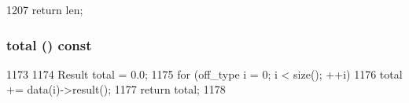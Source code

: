 \begin{DoxyCode}
1207 { return len; }
\end{DoxyCode}
\hypertarget{classStats_1_1VectorProxy_a35c6e2ed3fc81b40d69052a062113ead}{
\subsubsection[{total}]{ total () const}}
\label{classStats_1_1VectorProxy_a35c6e2ed3fc81b40d69052a062113ead}



\begin{DoxyCode}
1173     {
1174         Result total = 0.0;
1175         for (off_type i = 0; i < size(); ++i)
1176             total += data(i)->result();
1177         return total;
1178     }
\end{DoxyCode}


